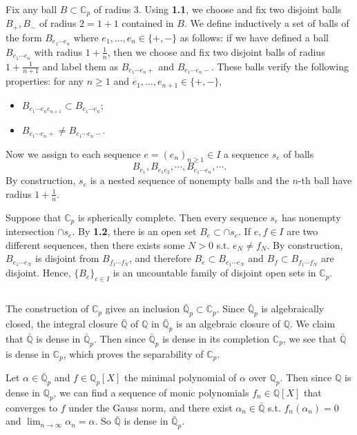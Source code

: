 \documentclass{article}
\theoremstyle{definition}
\theoremstyle{remark}
\newcommand{\C}{\mathbb{C}}
\newcommand{\Q}{\mathbb{Q}}
\begin{document}
Fix any ball $B\subset\C_p$ of radius $3$.
Using \textbf{1.1}, we choose and fix two disjoint balls $B_+, B_-$ of radius $2 = 1 + 1$
contained in $B$. We define inductively a set of balls of the form $B_{e_1\cdots e_n}$ where $e_1, \dots, e_n\in\{+, -\}$ as follows: if we have defined a ball $B_{e_1\cdots e_n}$ with radius $1 + \frac{1}{n}$, then we choose and fix two disjoint balls of radius $1 + \frac{1}{n+1}$
and label them as $B_{e_1\cdots e_n +}$ and $B_{e_1\cdots e_n-}$. These balls verify the following properties: for any $n\ge 1$ and $e_1, \dots, e_{n+1}\in\{+, -\}$,\begin{itemize}
    \item $B_{e_1\cdots e_ne_{n+1}}\subset B_{e_1\cdots e_n}$;
    \item $B_{e_1\cdots e_n+}\neq B_{e_1\cdots e_n-}$.
\end{itemize}

Now we assign to each sequence $e = (e_n)_{n\ge 1}\in I$
a sequence $s_e$ of balls \[B_{e_1}, B_{e_1e_2}, \cdots, B_{e_1\cdots e_n}, \cdots.\]
By construction, $s_e$ is a nested sequence of nonempty balls and the $n$-th ball have radius $1 + \frac{1}{n}$.

Suppose that $\C_p$ is spherically complete.
Then every sequence $s_e$ has nonempty intersection $\cap s_e$.
By \textbf{1.2}, there is an open set $B_e\subset\cap s_e$.
If $e,f\in I$ are two different sequences,
then there exists some $N > 0$ s.t. $e_N\ne f_N$.
By construction, $B_{e_1\cdots e_N}$ is disjoint from $B_{f_1\cdots f_N}$, and therefore $B_e\subset B_{e_1\cdots e_N}$ and $B_f\subset B_{f_1\cdots f_N}$ are disjoint.
Hence, $\{B_e\}_{e\in I}$ is an uncountable family of disjoint open sets in $\C_p$.


\subsection{}
The construction of $\C_p$ gives an inclusion $\bar{\Q}_p\subset\C_p$.
Since $\bar{\Q}_p$ is algebraically closed, the integral closure $\bar{\Q}$ of $\Q$ in $\bar{\Q}_p$ is an algebraic closure of $\Q$.
We claim that $\bar{\Q}$ is dense in $\bar{\Q}_p$.
Then since $\bar{\Q}_p$ is dense in its completion $\C_p$,
we see that $\bar{\Q}$ is dense in $\C_p$,
which proves the separability of $\C_p$.

Let $\alpha\in\bar{\Q}_p$ and $f\in \Q_p[X]$ the minimal polynomial of $\alpha$ over $\Q_p$.
Then since $\Q$ is dense in $\Q_p$, we can find a sequence of monic polynomials $f_n\in \Q[X]$ that converges to $f$ under the Gauss norm,
and there exist $\alpha_n\in\bar{\Q}$ s.t. $f_n(\alpha_n) = 0$ and $\lim_{n\to\infty}\alpha_n = \alpha$. So $\bar{\Q}$ is dense in $\bar{\Q}_p$.
\end{document}

